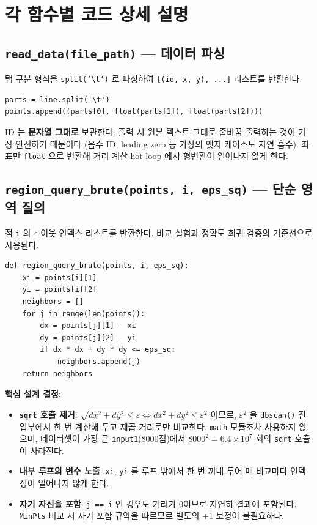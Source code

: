 \documentclass[12pt, a4paper]{article}
\begin{document}
\FloatBarrier


\section{각 함수별 코드 상세 설명}

\subsection{\texttt{read\_data(file\_path)} --- 데이터 파싱}

탭 구분 형식을 \texttt{split('\textbackslash t')} 로 파싱하여 \texttt{[(id, x, y), ...]} 리스트를 반환한다.

\begin{verbatim}
parts = line.split('\t')
points.append((parts[0], float(parts[1]), float(parts[2])))
\end{verbatim}

\noindent ID 는 \textbf{문자열 그대로} 보관한다. 출력 시 원본 텍스트 그대로 줄바꿈 출력하는 것이 가장 안전하기 때문이다 (음수 ID, leading zero 등 가상의 엣지 케이스도 자연 흡수). 좌표만 \texttt{float} 으로 변환해 거리 계산 hot loop 에서 형변환이 일어나지 않게 한다.


\subsection{\texttt{region\_query\_brute(points, i, eps\_sq)} --- 단순 영역 질의}

점 \texttt{i} 의 $\varepsilon$-이웃 인덱스 리스트를 반환한다. 비교 실험과 정확도 회귀 검증의 기준선으로 사용된다.

\begin{verbatim}
def region_query_brute(points, i, eps_sq):
    xi = points[i][1]
    yi = points[i][2]
    neighbors = []
    for j in range(len(points)):
        dx = points[j][1] - xi
        dy = points[j][2] - yi
        if dx * dx + dy * dy <= eps_sq:
            neighbors.append(j)
    return neighbors
\end{verbatim}

\noindent\textbf{핵심 설계 결정:}
\begin{itemize}
    \item \textbf{\texttt{sqrt} 호출 제거}: $\sqrt{dx^2+dy^2} \le \varepsilon \Leftrightarrow dx^2+dy^2 \le \varepsilon^2$ 이므로, $\varepsilon^2$ 을 \texttt{dbscan()} 진입부에서 한 번 계산해 두고 제곱 거리로만 비교한다. \texttt{math} 모듈조차 사용하지 않으며, 데이터셋이 가장 큰 \texttt{input1}(8000점)에서 $8000^2 = 6.4 \times 10^7$ 회의 \texttt{sqrt} 호출이 사라진다.
    \item \textbf{내부 루프의 변수 노출}: \texttt{xi}, \texttt{yi} 를 루프 밖에서 한 번 꺼내 두어 매 비교마다 인덱싱이 일어나지 않게 한다.
    \item \textbf{자기 자신을 포함}: \texttt{j == i} 인 경우도 거리가 0이므로 자연히 결과에 포함된다. \texttt{MinPts} 비교 시 자기 포함 규약을 따르므로 별도의 +1 보정이 불필요하다.
\end{itemize}
\end{document}
